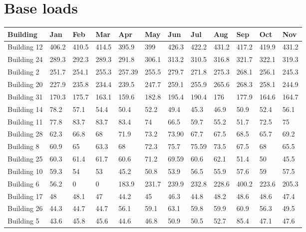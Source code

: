 \section{Base loads}
\begin{table}[!ht]
\begin{tabular}{ | l | l | l | l | l | l | l | l | l | l | l | l | }
\hline
	Building & Jan & Feb & Mar & Apr & May & Jun & Jul & Aug & Sep & Oct & Nov \\ \hline
	Building 12 & 406.2 & 410.5 & 414.5 & 395.9 & 399 & 426.3 & 422.2 & 431.2 & 417.2 & 419.9 & 431.2 \\ \hline
	Building 24 & 289.3 & 292.3 & 289.3 & 291.8 & 306.1 & 313.2 & 310.5 & 316.8 & 321.7 & 322.1 & 319.3 \\ \hline
	Building 2 & 251.7 & 254.1 & 255.3 & 257.39 & 255.5 & 279.7 & 271.8 & 275.3 & 268.1 & 256.1 & 245.3 \\ \hline
	Building 20 & 227.9 & 235.8 & 234.4 & 239.5 & 247.7 & 259.1 & 255.9 & 265.6 & 268.3 & 258.1 & 244.9 \\ \hline
	Building 31 & 170.3 & 175.7 & 163.1 & 159.6 & 182.8 & 195.4 & 190.4 & 176 & 177.9 & 164.6 & 164.7 \\ \hline
	Building 14 & 78.2 & 57.1 & 54.4 & 50.4 & 52.2 & 49.4 & 45.3 & 46.9 & 50.9 & 52.4 & 56.1 \\ \hline
	Building 11 & 77.8 & 83.7 & 83.7 & 83.4 & 74 & 66.5 & 59.7 & 55.2 & 51.7 & 72.5 & 75 \\ \hline
	Building 28 & 62.3 & 66.8 & 68 & 71.9 & 73.2 & 73.90 & 67.7 & 67.5 & 68.5 & 65.7 & 69.2 \\ \hline
	Building 8 & 60.9 & 65 & 63.3 & 68 & 72.3 & 75.7 & 75.59 & 73.5 & 67.5 & 68 & 65.5 \\ \hline
	Building 25 & 60.3 & 61.4 & 61.7 & 60.6 & 71.2 & 69.59 & 60.6 & 62.1 & 51.4 & 50 & 45.5 \\ \hline
	Building 10 & 59.3 & 54 & 53 & 45.2 & 50.8 & 53.9 & 56.5 & 55.9 & 57.6 & 59 & 57.5 \\ \hline
	Building 6 & 56.2 & 0 & 0 & 183.9 & 231.7 & 239.9 & 232.8 & 228.6 & 400.2 & 223.6 & 205.3 \\ \hline
	Building 17 & 48 & 48.1 & 47 & 44.2 & 45 & 46.3 & 44.8 & 48.2 & 48.6 & 48.6 & 47.4 \\ \hline
	Building 26 & 44.3 & 44.7 & 44.7 & 56.1 & 59.1 & 63.1 & 59.8 & 59.9 & 60.9 & 56.3 & 49.5 \\ \hline
	Building 5 & 43.6 & 45.8 & 45.6 & 44.6 & 46.8 & 50.9 & 50.5 & 52.7 & 85.4 & 47.1 & 47.6 \\ \hline

\end{tabular}
\end{table}
